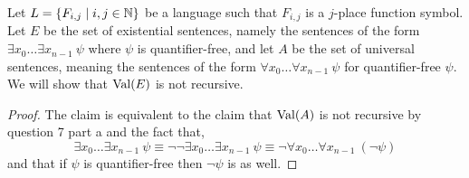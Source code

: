 \question{}
Let $L = \{ F_{i, j} \mid i, j \in \mathbb{N} \}$ be a language such that $F_{i, j}$ is a $j$-place function symbol.
Let $E$ be the set of existential sentences, namely the sentences of the form $\exists x_0 \ldots \exists x_{n - 1}\ \psi$ where $\psi$ is quantifier-free,
and let $A$ be the set of universal sentences, meaning the sentences of the form $\forall x_0 \ldots \forall x_{n - 1}\ \psi$ for quantifier-free $\psi$. \\
We will show that $\operatorname{Val}(E)$ is not recursive.
\begin{proof}
	The claim is equivalent to the claim that $\operatorname{Val}(A)$ is not recursive by question 7 part a and the fact that,
	\[
		\exists x_0 \ldots \exists x_{n - 1}\ \psi
		\equiv \lnot \lnot \exists x_0 \ldots \exists x_{n - 1}\ \psi
		\equiv \lnot \forall x_0 \ldots \forall x_{n - 1}\ (\lnot \psi)
	\]
	and that if $\psi$ is quantifier-free then $\lnot \psi$ is as well.


\end{proof}
